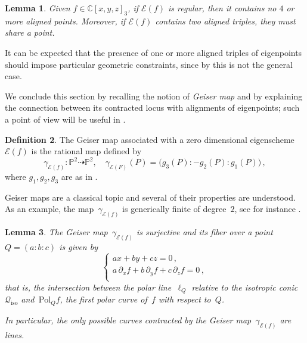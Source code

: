 \documentclass[a4paper, 11pt, reqno]{amsart}
\theoremstyle{plain}
\newtheorem{lemma}{Lemma}[section]
\theoremstyle{definition}
\newtheorem{definition}[lemma]{Definition}
\newcommand{\C}{\mathbb{C}}
\newcommand{\p}{\mathbb{P}}
\newcommand{\iso}{\mathcal{Q}_{\mathrm{iso}}}
\newcommand{\Eig}[1]{\mathcal{E}\!\left( {#1} \right)}
\begin{document}
\begin{lemma}
\label{lemma:no_4_aligned}
Given $f \in \C[x,y,z]_3$,
if $\Eig{f}$ is regular, then it contains no $4$ or more aligned points. 
Moreover, if $\Eig{f}$ contains two aligned triples, they must share a point.
\end{lemma}

It can be expected that the presence of one or more aligned triples of eigenpoints should impose particular geometric constraints, since by \cite[Theorem 5.7]{BGV} this is not the general case.

We conclude this section by recalling the notion of \emph{Geiser map} and by explaining the connection between its contracted locus with alignments of eigenpoints; such a point of view  will be useful in .

\begin{definition}
The Geiser map associated with a zero dimensional eigenscheme $\Eig{f}$ is the rational map defined by
%
\[
  \gamma_{\Eig{f}} \colon \p ^2 \dasharrow \p^2, \quad
  \gamma_{\Eig{F}} (P) = \bigl( g_3(P):-g_2(P):g_1(P) \bigr) \,,
\]
%
where $g_1, g_2, g_3$ are as in .
\end{definition}

Geiser maps are a classical topic and several of their properties are understood.
As an example, the map~$\gamma_{\Eig{f}}$ is generically finite of degree~$2$, see for instance \cite[Section~8.7.2]{Dolgachev}.

\begin{lemma}
The Geiser map~$\gamma_{\Eig{f}}$ is surjective and its fiber over a point $Q = (a:b:c)$ is given by
%
\begin{equation}
\label{eq:fibers}
  \left\{
  \begin{array}{l}
    a x + by + cz = 0 \,, \\[2pt]
    a \, \partial_x f + b \, \partial_y f + c \, \partial_z f = 0 \,,\\
  \end{array}
  \right.
\end{equation}
%
that is, the intersection between the polar line~$\ell_Q$ relative to the isotropic conic~$\iso$ and~$\mathrm{Pol}_Q f$, the
first polar curve of~$f$ with respect to~$Q$.

In particular, the only possible curves contracted by the Geiser map~$\gamma_{\Eig{f}}$ are lines.
\end{lemma}
\end{document}
